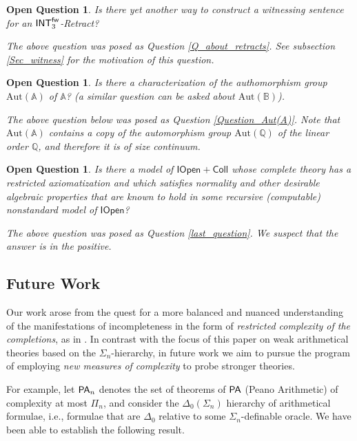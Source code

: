 \documentclass{amsart}
\newcommand{\qee} {\hspace*{2mm}\hfill \ding{109}}
\newtheorem{ques}[theorem]{Open Question}
\newenvironment{question}{\begin{ques} \rm}{\qee\end{ques}}
\newcommand{\pa}{{\sf PA}}
\begin{document}
\begin{question}
 Is there yet another way to construct a witnessing sentence for an ${\sf INT}_3^{\sf fw}$-Retract?

The above question was posed as  Question \ref{Q_about_retracts}. See subsection \ref{Sec_witness} for the motivation of this question.
\end{question}

\begin{question}
   Is there a characterization of the authomorphism group  $\mathrm{Aut}(\mathbb{A})$ of  $\mathbb{A}$? (a similar question can be asked about 
$\mathrm{Aut}(\mathbb{B})$).

The above question below was posed as Question \ref{Question_Aut(A)}. Note that $\mathrm{Aut}(\mathbb{A})$ contains a 
copy of the automorphism group $\mathrm{Aut}({\mathbb{Q}})$ of the linear order $\mathbb{Q}$, and therefore it is of size continuum. 
\end{question}


\begin{question}  
Is there a model of $\mathsf{IOpen + Coll}$ whose complete theory has a restricted axiomatization and which satisfies normality and other desirable algebraic properties that are known to hold in some recursive (computable) nonstandard model of $\mathsf{IOpen}$?   

The above question was posed as 
Question \ref{last_question}. We suspect that the answer is in the positive.
  \end{question}

\subsection{Future Work}
  Our work arose from the quest for a more balanced and nuanced understanding of the manifestations of incompleteness
  in the form of \emph{restricted complexity of the completions}, as in \cite{Enayat-Visser2024}. In contrast with the focus of this paper on weak arithmetical theories based on the $\Sigma_n$-hierarchy, in future work we aim to pursue the program of employing \emph{new measures
of complexity} to probe stronger theories. 

For example, let $\pa_n$ denotes the set of theorems of $\pa$ (Peano Arithmetic) of complexity at most $\Pi_n$, and consider the $\Delta_0(\Sigma_{n})$ hierarchy of arithmetical formulae, i.e., formulae that are $\Delta_0$ relative to some $\Sigma_{n}$-definable oracle. We have been able to establish the following result.
  
\end{document}
